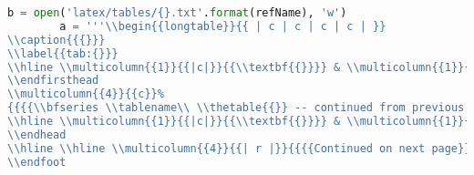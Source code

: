 \begin{lstlisting}[language=Python]
        b = open('latex/tables/{}.txt'.format(refName), 'w')
        a = '''\\begin{{longtable}}{{ | c | c | c | c | }}
\\caption{{{}}}
\\label{{tab:{}}}
\\hline \\multicolumn{{1}}{{|c|}}{{\\textbf{{}}}} & \\multicolumn{{1}}{{c|}}{{\\textbf{{Ab. Vol.}}}} & \\multicolumn{{1}}{{c|}}{{\\textbf{{News Time}}}} & \\multicolumn{{1}}{{c|}}{{\\textbf{{Headline}}}} \\\\ \\hline \\hline
\\endfirsthead
\\multicolumn{{4}}{{c}}%
{{{{\\bfseries \\tablename\\ \\thetable{{}} -- continued from previous page}}}} \\\\
\\hline \\multicolumn{{1}}{{|c|}}{{\\textbf{{}}}} & \\multicolumn{{1}}{{c|}}{{\\textbf{{Ab. Vol.}}}} & \\multicolumn{{1}}{{c|}}{{\\textbf{{News Time}}}} & \\multicolumn{{1}}{{c|}}{{\\textbf{{Headline}}}} \\\\ \\hline \\hline
\\endhead
\\hline \\hline \\multicolumn{{4}}{{| r |}}{{{{Continued on next page}}}} \\\\ \\hline
\\endfoot

\end{lstlisting}
